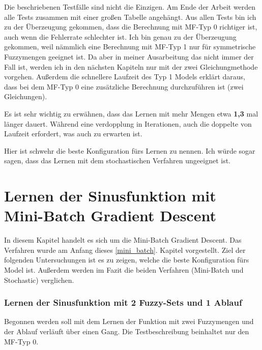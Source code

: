 Die beschriebenen Testfälle sind nicht die Einzigen. Am Ende der Arbeit werden alle Tests zusammen mit einer großen Tabelle angehängt. Aus allen Tests bin ich zu der Überzeugung gekommen, dass die Berechnung mit MF-Typ 0 richtiger ist, auch wenn die Fehlerrate schlechter ist. Ich bin genau zu der Überzeugung gekommen, weil nämmlich eine Berechnung mit MF-Typ 1 nur für symmetrische Fuzzymengen geeignet ist. Da aber in meiner Ausarbeitung das nicht immer der Fall ist, werden ich in den nächsten Kapiteln nur mit der zwei Gleichungmethode vorgehen. Außerdem die schnellere Laufzeit des Typ 1 Models erklärt daraus, dass bei dem MF-Typ 0 eine zusätzliche Berechnung durchzuführen ist (zwei Gleichungen).

Es ist sehr wichtig zu erwähnen, dass das Lernen mit mehr Mengen etwa \textbf{1,3} mal länger dauert. Während eine verdopplung in Iterationen, auch die doppelte von Laufzeit erfordert, was auch zu erwarten ist.

Hier ist schwehr die beste Konfiguration fürs Lernen zu nennen. Ich würde sogar sagen, dass das Lernen mit dem stochastischen Verfahren ungeeignet ist.

\section{Lernen der Sinusfunktion mit Mini-Batch Gradient Descent}

In diesem Kapitel handelt es sich um die Mini-Batch Gradient Descent. Das Verfahren wurde am Anfang dieses \ref{mini_batch}. Kapitel  vorgestellt. Ziel der folgenden Untersuchungen ist es zu zeigen, welche die beste Konfiguration fürs Model ist. Außerdem werden im Fazit die beiden Verfahren (Mini-Batch und Stochastic) verglichen. 

\subsubsection{Lernen der Sinusfunktion mit 2 Fuzzy-Sets und 1 Ablauf}

Begonnen werden soll mit dem Lernen der Funktion mit zwei Fuzzymengen und der Ablauf verläuft über einen Gang. Die Testbeschreibung beinhaltet nur den MF-Typ 0.

